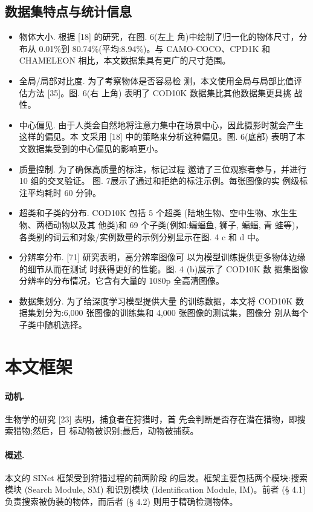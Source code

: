 \documentclass[final]{cvpr}
\newcommand{\mypara}[1]{\paragraph{#1.}}
\begin{document}
\subsection{数据集特点与统计信息}
\begin{itemize}
    \item 物体大小. 根据 [18] 的研究，在图. 6(左上 角)中绘制了归一化的物体尺寸，分布从 0.01\%到 80.74\%(平均:8.94\%)。与 CAMO-COCO、CPD1K 和 CHAMELEON 相比，本文数据集具有更广的尺寸范围。
    \item 全局/局部对比度. 为了考察物体是否容易检 测，本文使用全局与局部比值评估方法 [35]。图. 6(右 上角) 表明了 COD10K 数据集比其他数据集更具挑 战性。
    \item 中心偏见. 由于人类会自然地将注意力集中在场景中心，因此摄影时就会产生这样的偏见。本 文采用 [18] 中的策略来分析这种偏见。图. 6(底部) 表明了本文数据集受到的中心偏见的影响更小。
    \item 质量控制. 为了确保高质量的标注，标记过程 邀请了三位观察者参与，并进行 10 组的交叉验证。 图. 7展示了通过和拒绝的标注示例。每张图像的实 例级标注平均耗时 60 分钟。
    \item 超类和子类的分布. COD10K 包括 5 个超类 (陆地生物、空中生物、水生生物、两栖动物以及其 他类)和 69 个子类(例如:蝙蝠鱼, 狮子, 蝙蝠, 青 蛙等)，各类别的词云和对象/实例数量的示例分别显示在图. 4 c 和 d 中。
    \item 分辨率分布. [71] 研究表明，高分辨率图像可
以为模型训练提供更多物体边缘的细节从而在测试 时获得更好的性能。图. 4 (b)展示了 COD10K 数 据集图像分辨率的分布情况，它含有大量的 1080p 全高清图像。
    \item 数据集划分. 为了给深度学习模型提供大量 的训练数据，本文将 COD10K 数据集划分为:6,000 张图像的训练集和 4,000 张图像的测试集，图像分 别从每个子类中随机选择。
\end{itemize}

\section{本文框架}
\mypara{动机}生物学的研究 [23] 表明，捕食者在狩猎时，首 先会判断是否存在潜在猎物，即搜索猎物;然后，目 标动物被识别;最后，动物被捕获。
\mypara{概述}本文的 SINet 框架受到狩猎过程的前两阶段 的启发。框架主要包括两个模块:搜索模块 (Search Module, SM) 和识别模块 (Identification Module, IM)。前者 (§ 4.1) 负责搜索被伪装的物体，而后者 (§ 4.2) 则用于精确检测物体。
\end{document}
